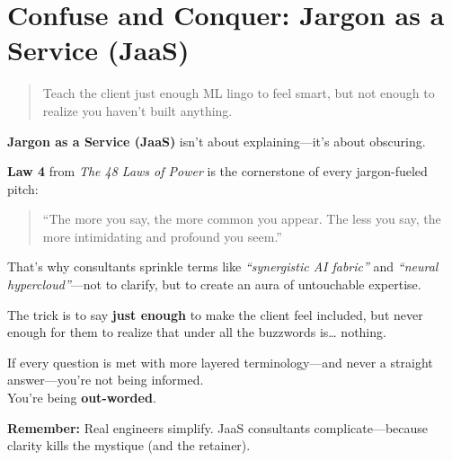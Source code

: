 \section{Confuse and Conquer: Jargon as a Service (JaaS)}

\begin{quote}
Teach the client just enough ML lingo to feel smart, but not enough to realize you haven’t built anything.
\end{quote}

  \textbf{Jargon as a Service (JaaS)} isn’t about explaining—it’s about obscuring.
  
  \medskip
  
  \textbf{Law 4} from \textit{The 48 Laws of Power} is the cornerstone of every jargon-fueled pitch:
  \begin{quote}
  ``The more you say, the more common you appear. The less you say, the more intimidating and profound you seem.''
  \end{quote}
  
  \medskip
  
  That’s why consultants sprinkle terms like \textit{``synergistic AI fabric''} and \textit{``neural hypercloud''}—not to clarify, but to create an aura of untouchable expertise.
  
  \medskip
  
  The trick is to say \textbf{just enough} to make the client feel included, but never enough for them to realize that under all the buzzwords is… nothing.
  
  \medskip
  
  If every question is met with more layered terminology—and never a straight answer—you’re not being informed. \\
  You’re being \textbf{out-worded}.
  
  \medskip
  
  \textbf{Remember:} Real engineers simplify. JaaS consultants complicate—because clarity kills the mystique (and the retainer).
  
  



